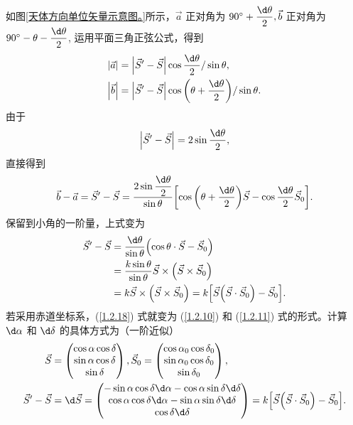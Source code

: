\documentclass[UTF8, 12pt, a4paper, oneside, onecolumn, fontset=none]{ctexart}
\begin{document}
如图\ref{天体方向单位矢量示意图。}所示，$\vec{a}$ 正对角为 $\ang{90;;}+\dfrac{\d\theta}{2}, \vec{b}$ 正对角为 $\ang{90;;}-\theta-\dfrac{\d\theta}{2}$, 运用平面三角正弦公式，得到
\begin{align}
\mleft\vert\vec{a}\mright\vert{}&=\mleft\vert\vec{S}'-\vec{S}\mright\vert\cos{\frac{\d\theta}{2}}/\sin{\theta},\\
\mleft\vert\vec{b}\mright\vert{}&=\mleft\vert\vec{S}'-\vec S\mright\vert\cos{\mleft(\theta+\frac{\d\theta}{2}\mright)}/\sin{\theta}.
\end{align}
由于
\begin{equation}
\mleft\vert\vec{S}'-\vec S\mright\vert{}=2\sin{\frac{\d\theta}{2}},
\end{equation}
直接得到
\begin{equation}
\vec{b}-\vec{a}=\vec{S}'-\vec{S}=\frac{2\sin{\dfrac{\d\theta}{2}}}{\sin{\theta}}\mleft[\cos{\mleft(\theta+\frac{\d\theta}{2}\mright)}\vec{S}-\cos{\frac{\d\theta}{2}}\vec{S}_{0}\mright].
\end{equation}
保留到小角的一阶量，上式变为
\begin{align}
\vec{S}'-\vec{S}&=\frac{\d\theta}{\sin{\theta}}\mleft(\cos{\theta}\cdot\vec{S}-\vec{S}_{0}\mright)\notag\\
&=\frac{k\sin{\theta}}{\sin{\theta}}\vec{S}\times\mleft(\vec{S}\times\vec{S}_{0}\mright)\notag\\
&=k\vec{S}\times\mleft(\vec{S}\times\vec{S}_{0}\mright)=k\mleft[\vec{S}\mleft(\vec{S}\cdot\vec{S}_{0}\mright)-\vec{S}_{0}\mright].\label{1.2.18}
\end{align}
若采用赤道坐标系，(\ref{1.2.18}) 式就变为 (\ref{1.2.10}) 和 (\ref{1.2.11}) 式的形式。计算 $\d\alpha$ 和 $\d\delta$ 的具体方式为（一阶近似）
\begin{align}
\vec{S}&=\begin{pmatrix}
\cos{\alpha}\cos{\delta}\\
\sin{\alpha}\cos{\delta}\\
\sin{\delta}
\end{pmatrix},
\vec{S}_{0}=\begin{pmatrix}
\cos{\alpha_{0}}\cos{\delta_{0}}\\
\sin{\alpha_{0}}\cos{\delta_{0}}\\
\sin{\delta_{0}}
\end{pmatrix},\\
\vec{S}'-\vec{S}&=\d\vec{S}=\begin{pmatrix}
-\sin{\alpha}\cos{\delta}\d\alpha-\cos{\alpha}\sin{\delta}\d\delta\\
\cos{\alpha}\cos{\delta}\d\alpha-\sin{\alpha}\sin{\delta}\d\delta\\
\cos{\delta}\d\delta
\end{pmatrix}
=k\mleft[\vec{S}\mleft(\vec{S}\cdot\vec{S}_{0}\mright)-\vec{S}_{0}\mright].
\end{align}
\end{document}
